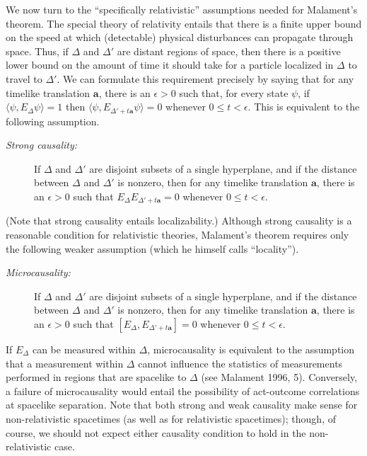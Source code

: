 \documentclass[12pt]{article}
\theoremstyle{remark}
\begin{document}
We now turn to the ``specifically relativistic'' assumptions needed
for Malament's theorem.  The special theory of relativity entails that
there is a finite upper bound on the speed at which (detectable)
physical disturbances can propagate through space.  Thus, if $\Delta$
and $\Delta '$ are distant regions of space, then there is a positive
lower bound on the amount of time it should take for a particle
localized in $\Delta$ to travel to $\Delta'$.  We can formulate this
requirement precisely by saying that for any timelike translation
$\mathbf{a}$, there is an $\epsilon >0$ such that, for every state
$\psi$, if $\langle \psi ,E_{\Delta}\psi \rangle =1$ then $\langle
\psi ,E_{\Delta '+t\mathbf{a}}\psi \rangle =0$ whenever $0\leq
t<\epsilon$.  This is equivalent to the following assumption.
\begin{description}
\item[{\it Strong causality:}] If $\Delta$ and $\Delta '$ are disjoint
  subsets of a single hyperplane, and if the distance between $\Delta$
  and $\Delta '$ is nonzero, then for any timelike translation
  $\mathbf{a}$, there is an $\epsilon >0$ such that
  $E_{\Delta}E_{\Delta '+t\mathbf{a}}=0$ whenever $0\leq t<\epsilon$.
\end{description} (Note that strong causality entails localizability.)
Although strong causality is a reasonable condition for relativistic
theories, Malament's theorem requires only the following weaker
assumption (which he himself calls ``locality'').
\begin{description}
\item[{\it Microcausality:}] If $\Delta$ and $\Delta '$ are disjoint
  subsets of a single hyperplane, and if the distance between $\Delta$
  and $\Delta '$ is nonzero, then for any timelike translation
  $\mathbf{a}$, there is an $\epsilon >0$ such that
  $[E_{\Delta},E_{\Delta '+t\mathbf{a}}]=0$ whenever $0\leq
  t<\epsilon$.  \end{description} If $E_{\Delta}$ can be measured
within $\Delta$, microcausality is equivalent to the assumption that a
measurement within $\Delta$ cannot influence the statistics of
measurements performed in regions that are spacelike to $\Delta$ (see
Malament 1996, 5).  Conversely, a failure of microcausality would
entail the possibility of act-outcome correlations at spacelike
separation.  Note that both strong and weak causality make sense for
non-relativistic spacetimes (as well as for relativistic spacetimes);
though, of course, we should not expect either causality condition to
hold in the non-relativistic case.
\end{document}
